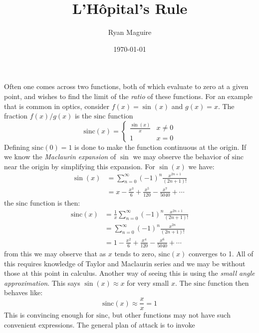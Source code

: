 \documentclass{article}
\title{L'H\^{o}pital's Rule}
\author{Ryan Maguire}
\date{\today}
\theoremstyle{plain}
\begin{document}
    \maketitle
    Often one comes across two functions, both of which evaluate
    to zero at a given point, and wishes to find the limit of the \textit{ratio}
    of these functions. For an example that is common in optics, consider
    $f(x)=\sin(x)$ and $g(x)=x$. The fraction $f(x)/g(x)$ is the
    $\textrm{sinc}$ function
    \begin{equation}
        \textrm{sinc}(x)=
        \begin{cases}
            \frac{\sin(x)}{x}&x\ne{0}\\
            1&x=0
        \end{cases}
    \end{equation}
    Defining $\textrm{sinc}(0)=1$ is done to make the function continuous at
    the origin. If we know the \textit{Maclaurin expansion} of $\sin$ we may
    observe the behavior of $\textrm{sinc}$ near the origin by simplifying this
    expansion. For $\sin(x)$ we have:
    \begin{align}
        \sin(x)
            &=\sum_{n=0}^{\infty}(-1)^{n}\frac{x^{2n+1}}{(2n+1)!}\\
            &=x-\frac{x^{3}}{6}+\frac{x^{5}}{120}-\frac{x^{7}}{5040}+\cdots
    \end{align}
    the $\textrm{sinc}$ function is then:
    \begin{align}
        \textrm{sinc}(x)
            &=\frac{1}{x}\sum_{n=0}^{\infty}(-1)^{n}\frac{x^{2n+1}}{(2n+1)!}\\
            &=\sum_{n=0}^{\infty}(-1)^{n}\frac{x^{2n}}{(2n+1)!}\\
            &=1-\frac{x^{2}}{6}+\frac{x^{4}}{120}-\frac{x^{6}}{5040}+\cdots
    \end{align}
    from this we may observe that as $x$ tends to zero, $\textrm{sinc}(x)$
    converges to 1. All of this requires knowledge of Taylor and Maclaurin
    series and we may be without those at this point in calculus. Another way
    of seeing this is using the \textit{small angle approximation}. This says
    $\sin(x)\approx{x}$ for very small $x$. The $\textrm{sinc}$ function then
    behaves like:
    \begin{equation}
        \textrm{sinc}(x)\approx\frac{x}{x}=1
    \end{equation}
    This is convincing enough for $\textrm{sinc}$, but other functions may not
    have such convenient expressions. The general plan of attack is to invoke
\end{document}
